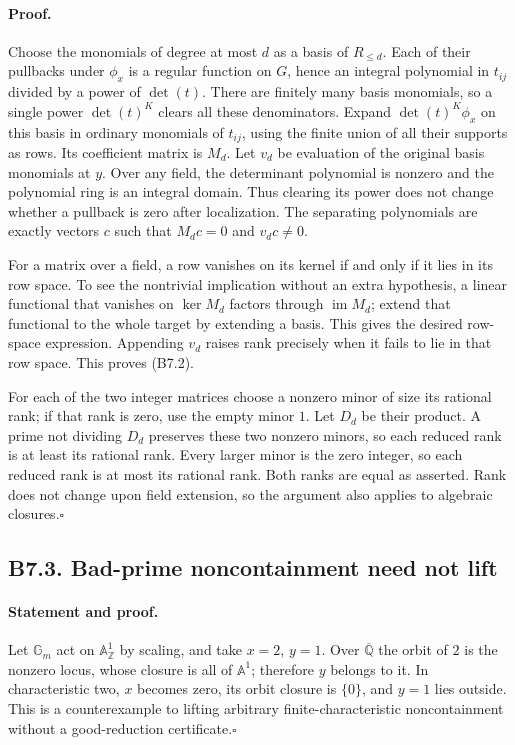 \documentclass[11pt,a4paper]{article}
\begin{document}
\paragraph{Proof.}
Choose the monomials of degree at most $d$ as a basis of
$R_{\leq d}$.  Each of their pullbacks under $\phi_x$ is a regular
function on $G$, hence an integral polynomial in $t_{ij}$ divided by
a power of $\det(t)$.  There are finitely many basis monomials, so a
single power $\det(t)^K$ clears all these denominators.  Expand
$\det(t)^K\phi_x$ on this basis in ordinary monomials of $t_{ij}$,
using the finite union of all their supports as rows.  Its coefficient
matrix is $M_d$.  Let $v_d$ be evaluation of the original basis
monomials at $y$.  Over any field, the determinant polynomial is
nonzero and the polynomial ring is an integral domain.  Thus clearing
its power does not change whether a pullback is zero after localization.
The separating polynomials are exactly vectors $c$ such that
$M_dc=0$ and $v_dc\neq0$.

For a matrix over a field, a row vanishes on its kernel if and only if
it lies in its row space.  To see the nontrivial implication without an
extra hypothesis, a linear functional that vanishes on $\ker M_d$
factors through $\operatorname{im}M_d$; extend that functional to the
whole target by extending a basis.  This gives the desired row-space
expression.  Appending $v_d$ raises rank precisely when it fails to lie
in that row space.  This proves (B7.2).

For each of the two integer matrices choose a nonzero minor of size
its rational rank; if that rank is zero, use the empty minor $1$.
Let $D_d$ be their product.  A prime not dividing $D_d$ preserves these
two nonzero minors, so each reduced rank is at least its rational rank.
Every larger minor is the zero integer, so each reduced rank is at most
its rational rank.  Both ranks are equal as asserted.  Rank does not
change upon field extension, so the argument also applies to algebraic
closures.\hfill$\square$

\subsection*{B7.3. Bad-prime noncontainment need not lift}
\paragraph{Statement and proof.}
Let $\mathbb G_m$ act on $\mathbb A^1_{\mathbb Z}$ by scaling,
and take $x=2$, $y=1$.  Over $\overline{\mathbb Q}$ the orbit of $2$
is the nonzero locus, whose closure is all of $\mathbb A^1$; therefore
$y$ belongs to it.  In characteristic two, $x$ becomes zero, its orbit
closure is $\{0\}$, and $y=1$ lies outside.  This is a counterexample
to lifting arbitrary finite-characteristic noncontainment without a
good-reduction certificate.\hfill$\square$
\end{document}
